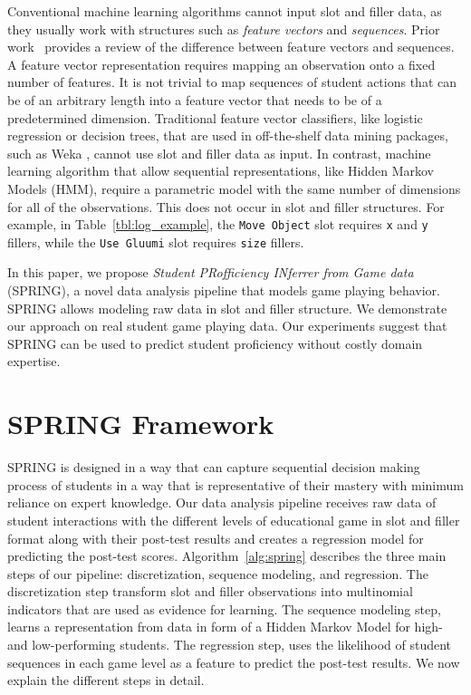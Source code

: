\documentclass{sigchi}
\def\algname{SPRING\xspace}
\begin{document}
Conventional machine learning algorithms cannot input slot and filler data, as they usually work with structures such as  \textit{feature vectors} and \textit{sequences}.
Prior work~\cite{sequences} provides a   review of  the difference between feature vectors and sequences.
A feature vector representation requires mapping an observation onto a fixed number of features.
It is not trivial to map sequences of student actions that can be of an arbitrary length into a feature vector that needs to be of a predetermined dimension.
Traditional feature vector classifiers,  like logistic regression or decision trees,  that are used in off-the-shelf data mining packages, such as Weka \cite{hall2009weka}, cannot  use slot and filler data as input. 
In contrast, machine learning algorithm that allow sequential representations, like Hidden Markov Models (HMM), require a parametric model with the same number of dimensions for all of the observations.
This does not occur in slot and filler structures.
For example,  in Table~\ref{tbl:log_example}, the \texttt{Move Object} slot requires \texttt{x} and \texttt{y} fillers, while the \texttt{Use Gluumi} slot requires \texttt{size} fillers.

In this paper, we propose \textit{Student PRofficiency INferrer from Game data} (SPRING), a novel data analysis pipeline that models game playing behavior.
\algname allows modeling raw data in slot and filler structure.
We demonstrate our approach on real student game playing data.
Our experiments suggest that \algname can be used to predict student proficiency  without costly domain expertise.

\section{SPRING Framework}

\algname is designed in a way that can capture sequential decision making process of students in a way that is representative of their mastery with minimum reliance on expert knowledge. Our data analysis pipeline receives raw data of student interactions with the different levels of educational game in slot and filler format along with their post-test results and creates a regression model for predicting the post-test scores. 
Algorithm~\ref{alg:spring} describes the three main steps of our pipeline: discretization,  sequence modeling, and regression.
The discretization step transform slot and filler observations into multinomial indicators that are used as evidence for learning.
The sequence modeling step, learns a representation from data in form of a Hidden Markov Model for high- and low-performing students.
The regression step, uses the likelihood of student sequences in each game level as a feature to predict the post-test results.
We now explain the different steps in detail.
\end{document}
